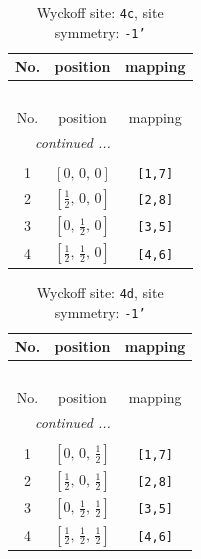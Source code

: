 \documentclass[fleqn,8pt]{jsarticle}
\begin{document}
\renewcommand{\arraystretch}{1.2}
\begin{longtable}{ccc}
\caption{Wyckoff site: {\tt 4c}, site symmetry: {\tt -1'}}
 \\
 \hline \hline
No. & position & mapping \\ \hline \endfirsthead

\multicolumn{2}{l}{\tablename\ \thetable{}} \\
 \hline \hline
No. & position & mapping \\ \hline \endhead

 \hline \hline
\multicolumn{2}{r}{\footnotesize\it continued ...} \\ \endfoot

 \hline \hline
\multicolumn{2}{r}{} \\ \endlastfoot

1 & $\left[ 0,\, 0,\, 0 \right]$ & {\tt [1,7]} \\ \hline
2 & $\left[ \frac{1}{2},\, 0,\, 0 \right]$ & {\tt [2,8]} \\ \hline
3 & $\left[ 0,\, \frac{1}{2},\, 0 \right]$ & {\tt [3,5]} \\ \hline
4 & $\left[ \frac{1}{2},\, \frac{1}{2},\, 0 \right]$ & {\tt [4,6]} \\
\end{longtable}
\renewcommand{\arraystretch}{1.2}
\begin{longtable}{ccc}
\caption{Wyckoff site: {\tt 4d}, site symmetry: {\tt -1'}}
 \\
 \hline \hline
No. & position & mapping \\ \hline \endfirsthead

\multicolumn{2}{l}{\tablename\ \thetable{}} \\
 \hline \hline
No. & position & mapping \\ \hline \endhead

 \hline \hline
\multicolumn{2}{r}{\footnotesize\it continued ...} \\ \endfoot

 \hline \hline
\multicolumn{2}{r}{} \\ \endlastfoot

1 & $\left[ 0,\, 0,\, \frac{1}{2} \right]$ & {\tt [1,7]} \\ \hline
2 & $\left[ \frac{1}{2},\, 0,\, \frac{1}{2} \right]$ & {\tt [2,8]} \\ \hline
3 & $\left[ 0,\, \frac{1}{2},\, \frac{1}{2} \right]$ & {\tt [3,5]} \\ \hline
4 & $\left[ \frac{1}{2},\, \frac{1}{2},\, \frac{1}{2} \right]$ & {\tt [4,6]} \\
\end{longtable}
\end{document}
